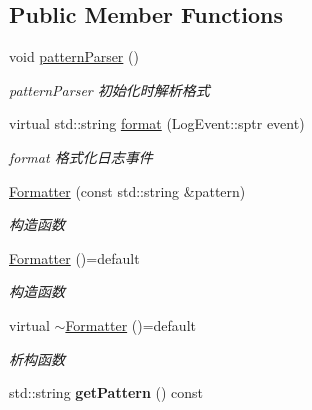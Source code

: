 \subsection*{Public Member Functions}
\begin{DoxyCompactItemize}
\item 
\mbox{\label{classDAQ_1_1Formatter_ad789bec7045b21dd5ef8c4829cfbf136}} 
void \hyperlink{classDAQ_1_1Formatter_ad789bec7045b21dd5ef8c4829cfbf136}{pattern\+Parser} ()
\begin{DoxyCompactList}\small\item\em pattern\+Parser 初始化时解析格式 \end{DoxyCompactList}\item 
virtual std\+::string \hyperlink{classDAQ_1_1Formatter_a76cd0f04adcfac5c592a57eba8a01a8f}{format} (Log\+Event\+::sptr event)
\begin{DoxyCompactList}\small\item\em format 格式化日志事件 \end{DoxyCompactList}\item 
\hyperlink{classDAQ_1_1Formatter_a4b0b8f984b2f0bfe9fc73982c00d8d62}{Formatter} (const std\+::string \&pattern)
\begin{DoxyCompactList}\small\item\em 构造函数 \end{DoxyCompactList}\item 
\mbox{\label{classDAQ_1_1Formatter_aa41860a9f75808fa93eb593bdb542f1e}} 
\hyperlink{classDAQ_1_1Formatter_aa41860a9f75808fa93eb593bdb542f1e}{Formatter} ()=default
\begin{DoxyCompactList}\small\item\em 构造函数 \end{DoxyCompactList}\item 
\mbox{\label{classDAQ_1_1Formatter_a1298dd1a67dfdc9f66fca5a049ed116b}} 
virtual \hyperlink{classDAQ_1_1Formatter_a1298dd1a67dfdc9f66fca5a049ed116b}{$\sim$\+Formatter} ()=default
\begin{DoxyCompactList}\small\item\em 析构函数 \end{DoxyCompactList}\item 
\mbox{\label{classDAQ_1_1Formatter_a230e01c7d10aed5c05ebbea286b64ec0}} 
std\+::string {\bfseries get\+Pattern} () const
\end{DoxyCompactItemize}
